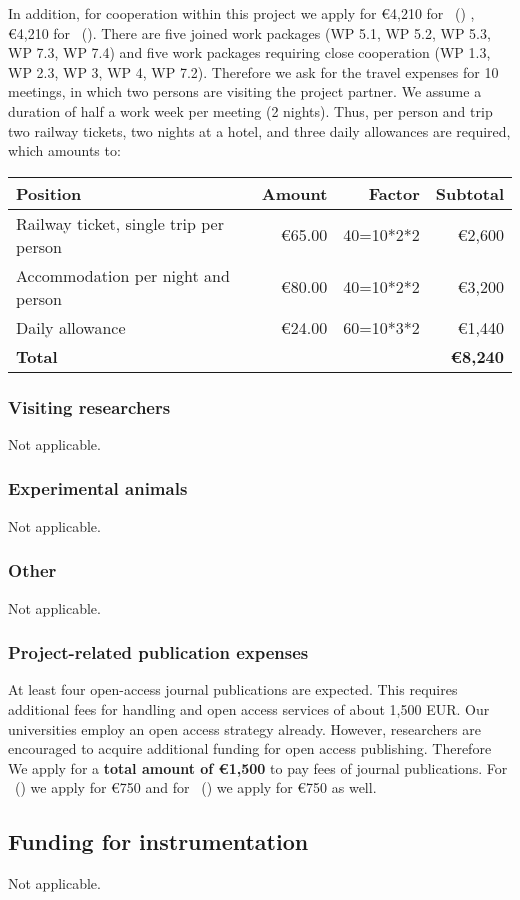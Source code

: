 \noindent In addition, for cooperation within this project we apply
for \euro 4,210 for \GroupAProf\ (\GroupA) , \euro 4,210 for
\GroupBProf~(\GroupB). There are five
joined work packages (WP 5.1, WP 5.2, WP 5.3, WP 7.3, WP 7.4) and five
work packages requiring close cooperation (WP 1.3, WP 2.3, WP 3, WP 4,
WP 7.2). Therefore we ask for the travel expenses for 10 meetings, in
which two persons are visiting the project partner.
We assume a duration of half a work week per meeting (2 nights). Thus,
per person and trip two railway tickets, two nights at a hotel, and
three daily allowances are required, which amounts to:

\vspace{6pt}
\noindent\begin{tabular}{lrrr}
\bfseries Position & \bfseries Amount &\bfseries Factor &\bfseries Subtotal \\\hline
Railway ticket, single trip per person & \euro 65.00 & 40=10*2*2 & \euro 2,600\\
Accommodation per night and person & \euro 80.00 & 40=10*2*2 & \euro 3,200\\
Daily allowance & \euro 24.00 & 60=10*3*2 & \euro 1,440 \\\cline{4-4}
\bfseries Total & & &  \bfseries \euro 8,240\\
\end{tabular}
\vspace{6pt}


\subsubsection{Visiting researchers}

\noindent Not applicable.

\subsubsection{Experimental animals}

\noindent Not applicable.

\subsubsection{Other}

\noindent Not applicable.

\subsubsection{Project-related publication expenses}
\noindent At least four open-access journal publications are expected. This requires additional fees for handling
and open access services of about 1,500 EUR. Our universities employ
an open access strategy already. However, researchers are encouraged
to acquire additional funding for open access publishing. Therefore We
apply for a {\bfseries total amount of \euro 1,500} to pay fees of
journal publications. For \GroupAProf~(\GroupA) we apply for \euro 750 and
for \GroupBProf~(\GroupB) we apply for \euro 750 as well.

\subsection{Funding for instrumentation}

\noindent Not applicable.

